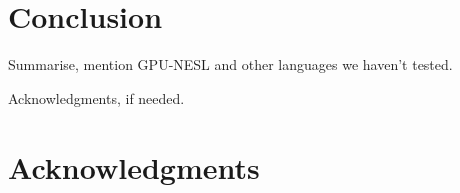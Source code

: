 \documentclass[preprint]{sigplanconf}
\begin{document}
\section{Conclusion}
Summarise, mention GPU-NESL and other languages we haven't tested.


\acks

Acknowledgments, if needed.

\section{Acknowledgments}



\end{document}
